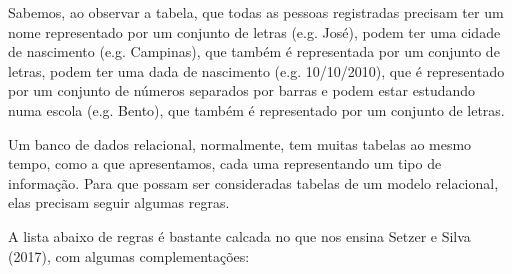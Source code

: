 Sabemos, ao observar a tabela, que todas as pessoas registradas precisam ter um nome representado por um conjunto de letras (e.g. José), podem ter uma cidade de nascimento (e.g. Campinas), que também é representada por um conjunto de letras, podem ter uma dada de nascimento (e.g. 10/10/2010), que é representado por um conjunto de números separados por barras e podem estar estudando numa escola (e.g. Bento), que também é representado por um conjunto de letras.

Um banco de dados relacional, normalmente, tem muitas tabelas ao mesmo tempo, como a que apresentamos, cada uma representando um tipo de informação. Para que possam ser consideradas tabelas de um modelo relacional, elas precisam seguir algumas regras.

A lista abaixo de regras é bastante calcada no que nos ensina  Setzer e Silva (2017), com algumas complementações:


